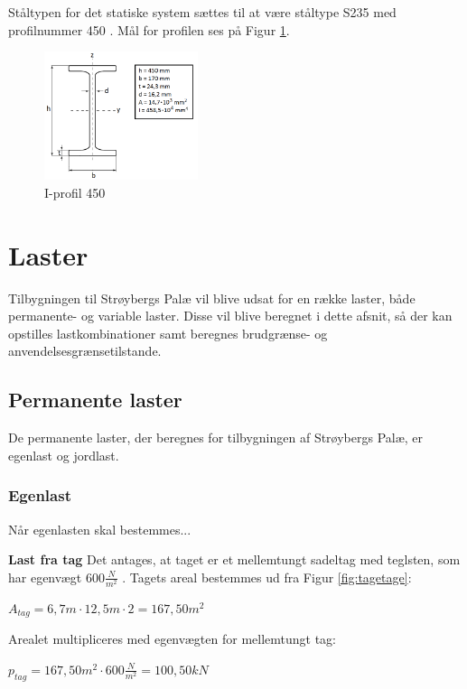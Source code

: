 Ståltypen for det statiske system sættes til at være ståltype S235 med profilnummer 450 \citep{stabi}. Mål for profilen ses på Figur \ref{fig:iprofil}. 

\begin{figure}[H]
	\centering
	\includegraphics[width=0.4\textwidth]{billeder/iprofil.png}
	\caption{I-profil 450}
	\label{fig:iprofil}
\end{figure}

\section{Laster}
Tilbygningen til Strøybergs Palæ vil blive udsat for en række laster, både permanente- og variable laster. Disse vil blive beregnet i dette afsnit, så der kan opstilles lastkombinationer samt beregnes brudgrænse- og anvendelsesgrænsetilstande.

\subsection{Permanente laster}
De permanente laster, der beregnes for tilbygningen af Strøybergs Palæ, er egenlast og jordlast.

\subsubsection{Egenlast}
Når egenlasten skal bestemmes...

\textbf{Last fra tag}
\newline
Det antages, at taget er et mellemtungt sadeltag med teglsten, som har egenvægt $600 \frac{N}{m^2}$ \citep{tag}.
\newline
\newline
Tagets areal bestemmes ud fra Figur \ref{fig:tagetage}:
\begin{center}
	$A_{tag} = 6,\!7 m\cdot 12,\!5 m \cdot 2=167,\!50 m^2$
\end{center}

Arealet multipliceres med egenvægten for mellemtungt tag:
\begin{center}
	$p_{tag} = 167,\!50 m^2\cdot 600 \frac{N}{m^2}=100,\!50 kN$
\end{center}

